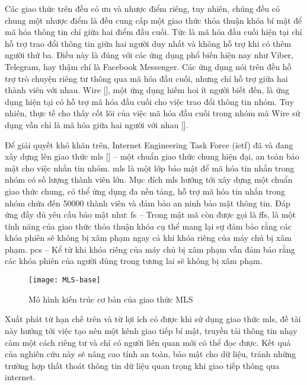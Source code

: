 \documentclass[../main-report.tex]{subfiles}
\begin{document}
Các giao thức trên đều có ưu và nhược điểm riêng, tuy nhiên, chúng đều có chung một nhược điểm là đều cung cấp một giao thức thỏa thuận khóa bí mật để mã hóa thông tin chỉ giữa hai điểm đầu cuối. Tức là mã hóa đầu cuối hiện tại chỉ hỗ trợ trao đổi thông tin giữa hai người duy nhất và không hỗ trợ khi có thêm người thứ ba. Điều này là đúng với các ứng dụng phổ biến hiện nay như Viber, Telegram, hay thậm chí là Facebook Messenger. Các ứng dụng nói trên đều hỗ trợ trò chuyện riêng tư thông qua mã hóa đầu cuối, nhưng chỉ hỗ trợ giữa hai thành viên với nhau. Wire [\cite{4}], một ứng dụng hiếm hoi ít người biết đến, là ứng dụng hiện tại có hỗ trợ mã hóa đầu cuối cho việc trao đổi thông tin nhóm. Tuy nhiên, thực tế cho thấy cốt lõi của việc mã hóa đầu cuối trong nhóm mà Wire sử dụng vẫn chỉ là mã hóa giữa hai người với nhau [\cite{5}]. 
	
Để giải quyết khó khăn trên, \glsdesc{Internet Engineering Task Force} (\acrshort{ietf}) đã và đang xây dựng lên giao thức \acrfull{mls} [\cite{6}] – một chuẩn giao thức chung hiện đại, an toàn bảo mật cho việc nhắn tin nhóm. \acrshort{mls} là một lớp bảo mật để mã hóa tin nhắn trong nhóm có số lượng thành viên lớn. Mục đích \acrshort{mls} hướng tới xây dựng một chuẩn giao thức chung, có thể ứng dụng đa nền tảng, hỗ trợ mã hóa tin nhắn trong nhóm chứa đến 50000 thành viên và đảm bảo an ninh bảo mật thông tin. Đáp ứng đầy đủ yêu cầu bảo mật như: \acrfull{fs} – Trong mật mã còn được gọi là \acrfull{ffs}, là một tính năng của giao thức thỏa thuận khóa cụ thể mang lại sự đảm bảo rằng các khóa phiên sẽ không bị xâm phạm ngay cả khi khóa riêng của máy chủ bị xâm phạm. \acrfull{pcs} – Kể từ khi khóa riêng của máy chủ bị xâm phạm vẫn đảm bảo rằng các khóa phiên của người dùng trong tương lai sẽ không bị xâm phạm.

\begin{figure}[ht!]
\begin{center}
\label{fig:MLS-base}
\texttt{[image: MLS-base]}
\caption{Mô hình kiến trúc cơ bản của giao thức MLS}
\end{center}
\end{figure}

Xuất phát từ hạn chế trên và từ lợi ích có được khi sử dụng giao thức \acrshort{mls}, đề tài này hướng tới việc tạo nên một kênh giao tiếp bí mật, truyền tải thông tin nhạy cảm một cách riêng tư và chỉ có người liên quan mới có thể đọc được. Kết quả của nghiên cứu này sẽ nâng cao tính an toàn, bảo mật cho dữ liệu, tránh những trường hợp thất thoát thông tin dữ liệu quan trọng khi giao tiếp thông qua internet. 
\end{document}

